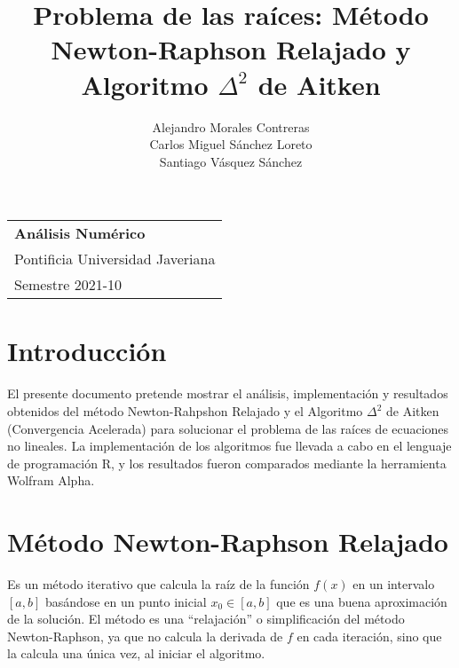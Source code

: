 \documentclass[a4paper,12pt]{article}
\begin{document}
\thispagestyle{empty}

\begin{tabular}{p{14cm}}
{\large \bf Análisis Numérico} \\
Pontificia Universidad Javeriana \\ Semestre 2021-10 \\
\hline
\end{tabular}

\title{Problema de las raíces: Método Newton-Raphson Relajado y Algoritmo $\Delta^2$ de Aitken}
\author{Alejandro Morales Contreras \\ Carlos Miguel Sánchez Loreto \\ Santiago Vásquez Sánchez}
\date{}

\begingroup
\let\newpage\relax
\maketitle
\endgroup


\section{Introducción}


El presente documento pretende mostrar el análisis, implementación y resultados obtenidos del método Newton-Rahpshon Relajado y el Algoritmo $\Delta^2$ de Aitken (Convergencia  Acelerada) para solucionar el problema de las raíces de ecuaciones no lineales. La implementación de los algoritmos fue llevada a cabo en el lenguaje de programación R, y los resultados fueron comparados mediante la herramienta Wolfram Alpha.


\section{Método Newton-Raphson Relajado}

Es un método iterativo que calcula la raíz de la función $f(x)$ en un intervalo $[a,b]$ basándose en un punto inicial $x_0 \in [a,b]$ que es una buena aproximación de la solución. El método es una ``relajación'' o simplificación del método Newton-Raphson, ya que no calcula la derivada de $f$ en cada iteración, sino que la calcula una única vez, al iniciar el algoritmo.
\end{document}
